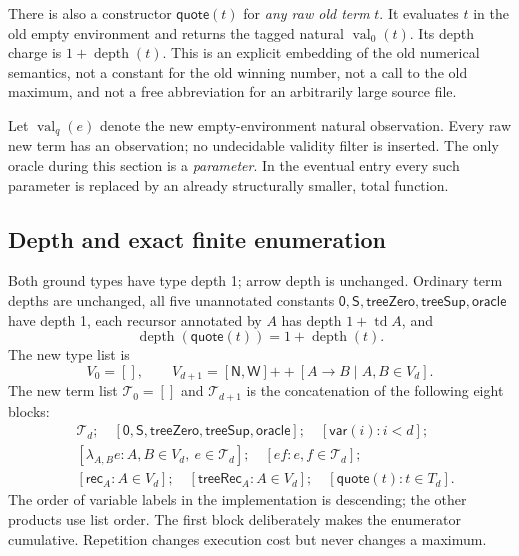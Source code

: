 \documentclass[11pt]{article}
\theoremstyle{definition}
\newcommand{\tyN}{\mathsf N}
\newcommand{\tyW}{\mathsf W}
\newcommand{\val}{\operatorname{val}}
\newcommand{\depth}{\operatorname{depth}}
\newcommand{\td}{\operatorname{td}}
\newcommand{\Qte}{\mathsf{quote}}
\newcommand{\Sc}{\mathsf S}
\newcommand{\Rc}{\mathsf{rec}}
\newcommand{\Oc}{\mathsf{oracle}}
\begin{document}
There is also a constructor $\Qte(t)$ for \emph{any raw old term} $t$.
It evaluates $t$ in the old empty environment and returns the tagged natural
$\val_0(t)$. Its depth charge is $1+\depth(t)$. This is an explicit embedding
of the old numerical semantics, not a constant for the old winning number,
not a call to the old maximum, and not a free abbreviation for an arbitrarily
large source file.

Let $\val_q(e)$ denote the new empty-environment natural observation. Every
raw new term has an observation; no undecidable validity filter is inserted.
The only oracle during this section is a \emph{parameter}. In the eventual
entry every such parameter is replaced by an already structurally smaller,
total function.

\subsection{Depth and exact finite enumeration}

Both ground types have type depth 1; arrow depth is unchanged. Ordinary term
depths are unchanged, all five unannotated constants
$\mathsf0,\Sc,\mathsf{treeZero},\mathsf{treeSup},\Oc$ have depth 1, each
recursor annotated by $A$ has depth $1+\td A$, and
\[
 \depth(\Qte(t))=1+\depth(t).
\]
The new type list is
\[
 V_0=[],\qquad V_{d+1}=[\tyN,\tyW]
       \mathbin{+\!+}[A\to B\mid A,B\in V_d].
\]
The new term list $\mathcal T_0=[]$ and $\mathcal T_{d+1}$ is the concatenation
of the following eight blocks:
\begin{equation}\label{eq:enum}
\begin{split}
 &\mathcal T_d;\quad
 [\mathsf0,\Sc,\mathsf{treeZero},\mathsf{treeSup},\Oc];\quad
 [\mathsf{var}(i):i<d];\\
 &[\lambda_{A,B}e:A,B\in V_d,\ e\in\mathcal T_d];\quad
 [ef:e,f\in\mathcal T_d];\\
 &[\Rc_A:A\in V_d];\quad
 [\mathsf{treeRec}_A:A\in V_d];\quad
 [\Qte(t):t\in T_d].
\end{split}
\end{equation}
The order of variable labels in the implementation is descending; the other
products use list order. The first block deliberately makes the enumerator
cumulative. Repetition changes execution cost but never changes a maximum.
\end{document}
